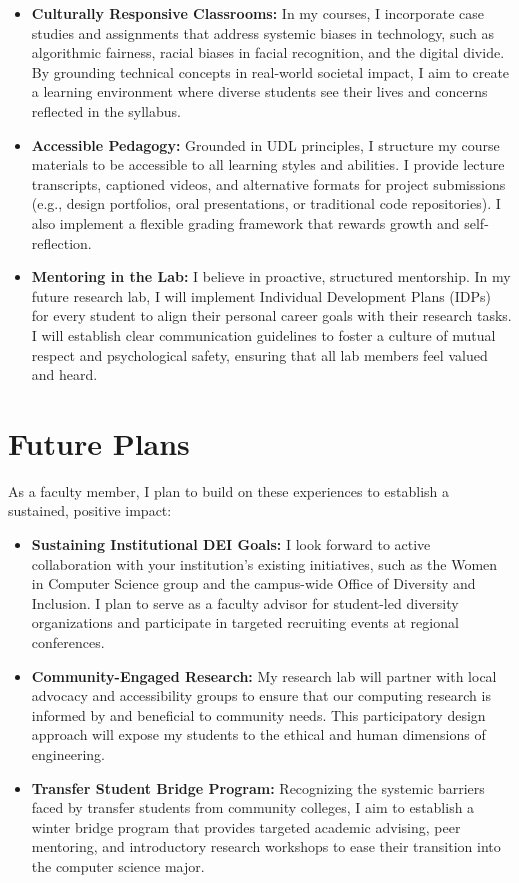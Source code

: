 \documentclass[11pt,letterpaper]{article}
\begin{document}
\begin{itemize}
    \item \textbf{Culturally Responsive Classrooms:} In my courses, I incorporate case studies and assignments that address systemic biases in technology, such as algorithmic fairness, racial biases in facial recognition, and the digital divide. By grounding technical concepts in real-world societal impact, I aim to create a learning environment where diverse students see their lives and concerns reflected in the syllabus.
    \item \textbf{Accessible Pedagogy:} Grounded in UDL principles, I structure my course materials to be accessible to all learning styles and abilities. I provide lecture transcripts, captioned videos, and alternative formats for project submissions (e.g., design portfolios, oral presentations, or traditional code repositories). I also implement a flexible grading framework that rewards growth and self-reflection.
    \item \textbf{Mentoring in the Lab:} I believe in proactive, structured mentorship. In my future research lab, I will implement Individual Development Plans (IDPs) for every student to align their personal career goals with their research tasks. I will establish clear communication guidelines to foster a culture of mutual respect and psychological safety, ensuring that all lab members feel valued and heard.
\end{itemize}

\section{Future Plans}

As a faculty member, I plan to build on these experiences to establish a sustained, positive impact:

\begin{itemize}
    \item \textbf{Sustaining Institutional DEI Goals:} I look forward to active collaboration with your institution's existing initiatives, such as the Women in Computer Science group and the campus-wide Office of Diversity and Inclusion. I plan to serve as a faculty advisor for student-led diversity organizations and participate in targeted recruiting events at regional conferences.
    \item \textbf{Community-Engaged Research:} My research lab will partner with local advocacy and accessibility groups to ensure that our computing research is informed by and beneficial to community needs. This participatory design approach will expose my students to the ethical and human dimensions of engineering.
    \item \textbf{Transfer Student Bridge Program:} Recognizing the systemic barriers faced by transfer students from community colleges, I aim to establish a winter bridge program that provides targeted academic advising, peer mentoring, and introductory research workshops to ease their transition into the computer science major.
\end{itemize}
\end{document}
